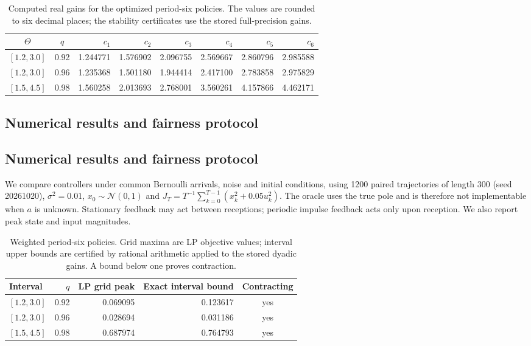\documentclass[preprint,12pt,numbers]{elsarticle}
\theoremstyle{definition}
\begin{document}
\begin{table}[t]
\centering
\caption{Computed real gains for the optimized period-six
policies. The values are rounded to six decimal places;
the stability certificates use the stored full-precision gains.}
\label{tab:periodic_gains}
\scriptsize
\setlength{\tabcolsep}{3pt}
\begin{tabular}{@{}ccrrrrrr@{}}
\toprule
$\Theta$ & $q$ & $c_1$ & $c_2$ & $c_3$ & $c_4$ & $c_5$ & $c_6$ \\
\midrule
$[1.2,3.0]$ & 0.92 &
1.244771 & 1.576902 & 2.096755 & 2.569667 & 2.860796 & 2.985588 \\
$[1.2,3.0]$ & 0.96 &
1.235368 & 1.501180 & 1.944414 & 2.417100 & 2.783858 & 2.975829 \\
$[1.5,4.5]$ & 0.98 &
1.560258 & 2.013693 & 2.768001 & 3.560261 & 4.157866 & 4.462171 \\
\bottomrule
\end{tabular}
\end{table}

\subsection{Numerical results and fairness protocol}\label{sec:experiments}


\subsection{Numerical results and fairness protocol}\label{sec:experiments}
We compare controllers under common Bernoulli arrivals, noise and initial conditions, using 1200 paired trajectories of length 300 (seed 20261020), $\sigma^2=0.01$, $x_0\sim\mathcal N(0,1)$ and $J_T=T^{-1}\sum_{k=0}^{T-1}(x_k^2+0.05u_k^2)$. The oracle uses the true pole and is therefore not implementable when $a$ is unknown. Stationary feedback may act between receptions; periodic impulse feedback acts only upon reception. We also report peak state and input magnitudes.

\begin{table}[t]\centering\small
\caption{Weighted period-six policies. Grid maxima are LP objective values; interval upper bounds are certified by rational arithmetic applied to the stored dyadic gains. A bound below one proves contraction.}\label{tab:weighted}
\begin{tabular}{@{}lrrrc@{}}\toprule
Interval & $q$ & LP grid peak & Exact interval bound & Contracting\\\midrule
$[1.2,3.0]$ & 0.92 & 0.069095 & 0.123617 & yes \\
$[1.2,3.0]$ & 0.96 & 0.028694 & 0.031186 & yes \\
$[1.5,4.5]$ & 0.98 & 0.687974 & 0.764793 & yes \\
\bottomrule\end{tabular}
\end{table}
\end{document}
